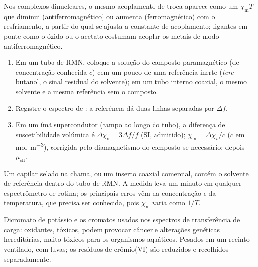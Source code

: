 Nos complexos dinucleares, o mesmo acoplamento de troca aparece como um $\chi_{\mathrm m}T$ que
diminui (antiferromagnético) ou aumenta (ferromagnético) com o resfriamento, a partir
do qual se ajusta a constante de acoplamento; ligantes em ponte como o óxido ou o
acetato costumam acoplar os metais de modo antiferromagnético.

\begin{method}\label{met:b3:complex-spectra-magnetism:evans}
\begin{enumerate}
  \item Em um tubo de RMN, coloque a solução do composto paramagnético (de concentração
        conhecida $c$) com um pouco de uma referência inerte (\textit{terc}-butanol, o sinal
        residual do solvente); em um tubo interno coaxial, o mesmo solvente e a mesma
        referência sem o composto.
  \item Registre o espectro de : a referência dá duas linhas separadas por $\Delta f$.
  \item Em um ímã supercondutor (campo ao longo do tubo), a diferença de suscetibilidade
        volúmica é $\Delta\chi_v = 3\Delta f/f$ (SI, admitido); $\chi_{\mathrm m} = \Delta\chi_v/c$ ($c$ em
        \unit{mol.m^{-3}}), corrigida pelo diamagnetismo do composto se necessário;
        depois $\mu_{\mathrm{eff}}$.
\end{enumerate}
\end{method}

\begin{inthelab}
Um capilar selado na chama, ou um inserto coaxial comercial, contém o solvente de
referência dentro do tubo de RMN. A medida leva um minuto em qualquer espectrômetro
de rotina; os principais erros vêm da concentração e da temperatura, que precisa ser
conhecida, pois $\chi_{\mathrm m}$ varia como $1/T$.
\end{inthelab}

\begin{safety}{}
Dicromato de potássio e os cromatos usados nos espectros de transferência de carga:
oxidantes, tóxicos, podem provocar câncer e alterações genéticas hereditárias, muito
tóxicos para os organismos aquáticos. Pesados em um recinto ventilado, com luvas; os
resíduos de crômio(VI) são reduzidos e recolhidos separadamente.
\end{safety}

